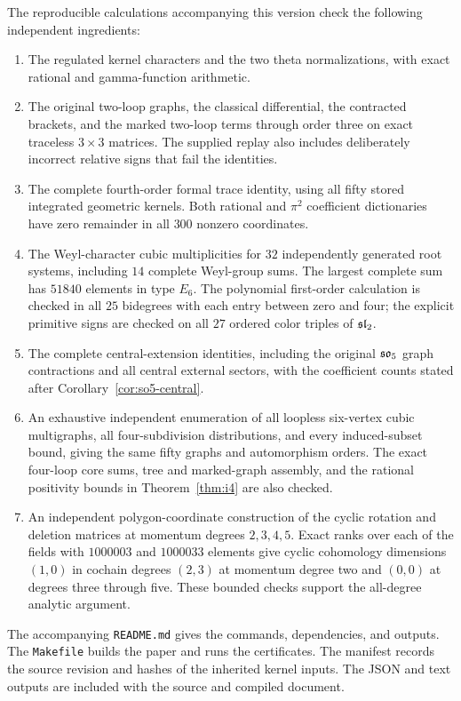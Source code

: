 The reproducible calculations accompanying this version
check the following independent ingredients:
\begin{enumerate}
\item The regulated kernel characters and the two theta
normalizations, with exact rational and gamma-function
arithmetic.
\item The original two-loop graphs, the classical differential,
the contracted brackets, and the marked two-loop terms
through order three on exact traceless $3\times3$ matrices.
The supplied replay also includes deliberately incorrect
relative signs that fail the identities.
\item The complete fourth-order formal trace identity,
using all fifty stored integrated geometric kernels.
Both rational and $\pi^2$ coefficient dictionaries have
zero remainder in all $300$ nonzero coordinates.
\item The Weyl-character cubic multiplicities for $32$
independently generated root systems, including $14$
complete Weyl-group sums. The largest complete sum has
$51840$ elements in type $E_6$.
The polynomial first-order calculation is checked in all
$25$ bidegrees with each entry between zero and four;
the explicit primitive signs are checked on all $27$
ordered color triples of $\mathfrak{sl}_2$.
\item The complete central-extension identities, including
the original $\mathfrak{so}_5$ graph contractions and all central
external sectors, with the coefficient counts stated
after Corollary~\ref{cor:so5-central}.
\item An exhaustive independent enumeration of all loopless
six-vertex cubic multigraphs, all four-subdivision distributions,
and every induced-subset bound, giving the same fifty graphs
and automorphism orders. The exact four-loop core sums,
tree and marked-graph assembly, and the rational
positivity bounds in Theorem~\ref{thm:i4} are also checked.
\item An independent polygon-coordinate construction of the
cyclic rotation and deletion matrices at momentum degrees
$2,3,4,5$. Exact ranks over each of the fields with
$1000003$ and $1000033$ elements give cyclic cohomology
dimensions $(1,0)$ in cochain degrees $(2,3)$ at momentum
degree two and $(0,0)$ at degrees three through five.
These bounded checks support the all-degree analytic argument.
\end{enumerate}
The accompanying \texttt{README.md} gives the commands,
dependencies, and outputs. The \texttt{Makefile} builds
the paper and runs the certificates. The manifest records
the source revision and hashes of the inherited kernel
inputs. The JSON and text outputs are included with the
source and compiled document.

